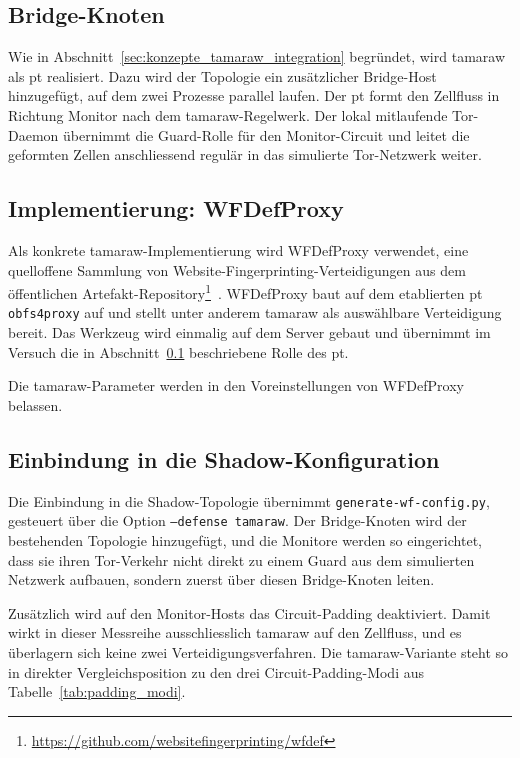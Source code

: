 \subsection{Bridge-Knoten}
\label{sec:realisierung_tamaraw_bridge}

Wie in Abschnitt~\ref{sec:konzepte_tamaraw_integration} begründet, wird \gls{tamaraw} als \gls{pt} realisiert.
Dazu wird der Topologie ein zusätzlicher Bridge-Host hinzugefügt, auf dem zwei Prozesse parallel laufen.
Der \gls{pt} formt den Zellfluss in Richtung Monitor nach dem \gls{tamaraw}-Regelwerk.
Der lokal mitlaufende Tor-Daemon übernimmt die Guard-Rolle für den Monitor-Circuit und leitet die geformten Zellen anschliessend regulär in das simulierte Tor-Netzwerk weiter.

\subsection{Implementierung: WFDefProxy}
\label{sec:realisierung_tamaraw_obfs4}

Als konkrete \gls{tamaraw}-Implementierung wird WFDefProxy verwendet, eine quelloffene Sammlung von Website-Fingerprinting-Verteidigungen aus dem öffentlichen Artefakt-Repository\footnote{\url{https://github.com/websitefingerprinting/wfdef}}~\cite{wfdefproxy}.
WFDefProxy baut auf dem etablierten \gls{pt} \texttt{obfs4proxy} auf und stellt unter anderem \gls{tamaraw} als auswählbare Verteidigung bereit.
Das Werkzeug wird einmalig auf dem Server gebaut und übernimmt im Versuch die in Abschnitt~\ref{sec:realisierung_tamaraw_bridge} beschriebene Rolle des \gls{pt}.

Die \gls{tamaraw}-Parameter werden in den Voreinstellungen von WFDefProxy belassen.

\subsection{Einbindung in die Shadow-Konfiguration}
\label{sec:realisierung_tamaraw_shadow}

Die Einbindung in die Shadow-Topologie übernimmt \texttt{generate-wf-config.py}, gesteuert über die Option \texttt{--defense tamaraw}.
Der Bridge-Knoten wird der bestehenden Topologie hinzugefügt, und die Monitore werden so eingerichtet, dass sie ihren Tor-Verkehr nicht direkt zu einem Guard aus dem simulierten Netzwerk aufbauen, sondern zuerst über diesen Bridge-Knoten leiten.

Zusätzlich wird auf den Monitor-Hosts das Circuit-Padding deaktiviert.
Damit wirkt in dieser Messreihe ausschliesslich \gls{tamaraw} auf den Zellfluss, und es überlagern sich keine zwei Verteidigungsverfahren.
Die \gls{tamaraw}-Variante steht so in direkter Vergleichsposition zu den drei Circuit-Padding-Modi aus Tabelle~\ref{tab:padding_modi}.